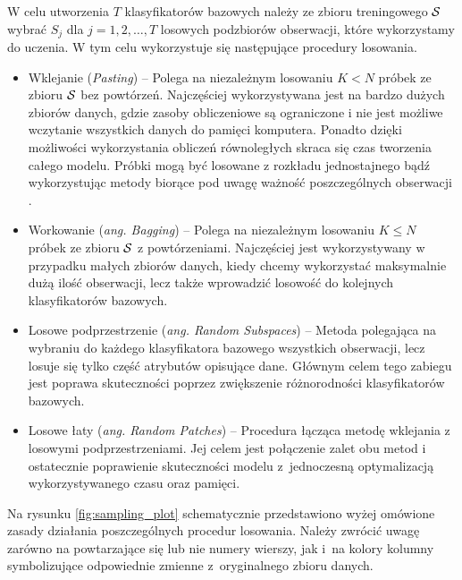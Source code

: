 \documentclass[inzynierska]{pwr_wmat_praca_dyplomowa}
\theoremstyle{plain}
\numberwithin{theorem}{chapter}
\theoremstyle{definition}
\numberwithin{theorem}{chapter}
\begin{document}
W celu utworzenia $T$ klasyfikatorów bazowych należy ze zbioru treningowego $\mathcal{S}$ wybrać $S_j$ dla $j=1,2,\dots,T$ losowych podzbiorów obserwacji, które wykorzystamy do uczenia. W tym celu wykorzystuje się następujące procedury losowania.

\begin{itemize}
	\item Wklejanie (\textit{Pasting}) -- Polega na niezależnym losowaniu $K < N$ próbek ze zbioru $\mathcal{S}$ bez powtórzeń. Najczęściej wykorzystywana jest na bardzo dużych zbiorów danych, gdzie zasoby obliczeniowe są ograniczone i nie jest możliwe wczytanie wszystkich danych do pamięci komputera. Ponadto dzięki możliwości wykorzystania obliczeń równoległych skraca się czas tworzenia całego modelu. Próbki mogą być losowane z rozkładu jednostajnego bądź wykorzystując metody biorące pod uwagę ważność poszczególnych obserwacji \cite{Pasting}.
	\item Workowanie (\textit{ang. Bagging}) -- Polega na niezależnym losowaniu $K \leq N$ próbek ze zbioru $\mathcal{S}$ z powtórzeniami. Najczęściej jest wykorzystywany w przypadku małych zbiorów danych, kiedy chcemy wykorzystać maksymalnie dużą ilość obserwacji, lecz także wprowadzić losowość do kolejnych klasyfikatorów bazowych.
	\item Losowe podprzestrzenie (\textit{ang. Random Subspaces}) -- Metoda polegająca na wybraniu do każdego klasyfikatora bazowego wszystkich obserwacji, lecz losuje się tylko część atrybutów opisujące dane. Głównym celem tego zabiegu jest poprawa skuteczności poprzez zwiększenie różnorodności klasyfikatorów bazowych. \cite{Random_Subspace}
	\item Losowe łaty (\textit{ang. Random Patches}) -- Procedura łącząca metodę wklejania z losowymi podprzestrzeniami. Jej celem jest połączenie zalet obu metod i ostatecznie poprawienie skuteczności modelu z~jednoczesną optymalizacją wykorzystywanego czasu oraz pamięci. \cite{Random_Patches}
\end{itemize}
Na rysunku \ref{fig:sampling_plot} schematycznie przedstawiono wyżej omówione zasady działania poszczególnych procedur losowania. Należy zwrócić uwagę zarówno na powtarzające się lub nie numery wierszy, jak i~na kolory kolumny symbolizujące odpowiednie zmienne z~oryginalnego zbioru danych.
\end{document}
